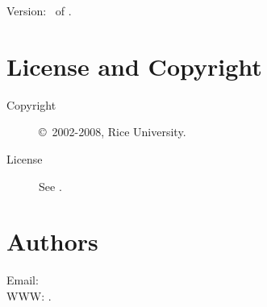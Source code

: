 \documentclass[english]{article}
\begin{document}
Version: \Version\ of \Date.

\section{License and Copyright}

\begin{description}
\item[Copyright] \copyright\ 2002-2008, Rice University.
\item[License] See .
\end{description}

\section{Authors}

Email:  \\
WWW: .

\LatexManEnd
\end{document}
